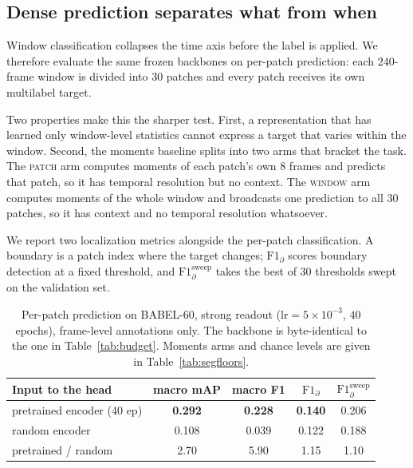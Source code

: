 \subsection{Dense prediction separates what from when}
\label{sec:segmentation}

Window classification collapses the time axis before the label is applied. We therefore
evaluate the same frozen backbones on per-patch prediction: each $240$-frame window is
divided into $30$ patches and every patch receives its own multilabel target.

Two properties make this the sharper test. First, a representation that has learned only
window-level statistics cannot express a target that varies within the window. Second,
the moments baseline splits into two arms that bracket the task. The \textsc{patch} arm
computes moments of each patch's own $8$ frames and predicts that patch, so it has
temporal resolution but no context. The \textsc{window} arm computes moments of the
whole window and broadcasts one prediction to all $30$ patches, so it has context and no
temporal resolution whatsoever.

We report two localization metrics alongside the per-patch classification. A boundary is
a patch index where the target changes; $\text{F1}_\partial$ scores boundary detection at
a fixed threshold, and $\text{F1}_\partial^{\text{sweep}}$ takes the best of $30$
thresholds swept on the validation set.

\begin{table}[t]
\centering
\small
\begin{tabular}{lcccc}
\toprule
Input to the head & macro mAP & macro F1 & $\text{F1}_\partial$ & $\text{F1}_\partial^{\text{sweep}}$ \\
\midrule
pretrained encoder (40 ep) & \textbf{0.292} & \textbf{0.228} & \textbf{0.140} & 0.206 \\
random encoder             & 0.108 & 0.039 & 0.122 & 0.188 \\
\midrule
pretrained / random        & 2.70  & 5.90  & 1.15  & 1.10  \\
\bottomrule
\end{tabular}
\caption{Per-patch prediction on BABEL-60, strong readout
($\text{lr}=5\times10^{-3}$, $40$ epochs), frame-level annotations only. The backbone is
byte-identical to the one in Table~\ref{tab:budget}. Moments arms and chance levels are
given in Table~\ref{tab:segfloors}.}
\label{tab:segmentation}
\end{table}

